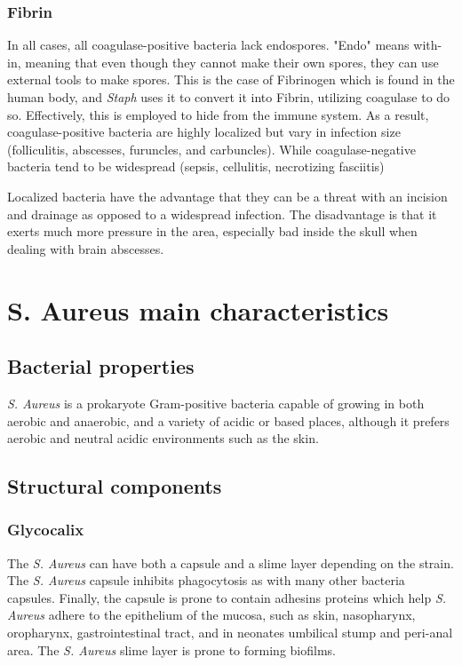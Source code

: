 \subsubsection{Fibrin}
\label{staph:Fibrin}

In all cases, all coagulase-positive bacteria lack endospores. "Endo" means with-in, meaning that even though they cannot make their own spores, they can use external tools to make spores. This is the case of Fibrinogen which is found in the human body, and \textit{Staph} uses it to convert it into Fibrin, utilizing coagulase to do so. Effectively, this is employed to hide from the immune system. As a result, coagulase-positive bacteria are highly localized but vary in infection size (folliculitis, abscesses, furuncles, and carbuncles). While coagulase-negative bacteria tend to be widespread (sepsis, cellulitis, necrotizing fasciitis)

Localized bacteria have the advantage that they can be a threat with an incision and drainage as opposed to a widespread infection. The disadvantage is that it exerts much more pressure in the area, especially bad inside the skull when dealing with brain abscesses.

\section{S. Aureus main characteristics}

\subsection{Bacterial properties}

\textit{S. Aureus} is a prokaryote Gram-positive bacteria capable of growing in both aerobic and anaerobic, and a variety of acidic or based places, although it prefers aerobic and neutral acidic environments such as the skin.

\subsection{Structural components}

\subsubsection{Glycocalix}

The \textit{S. Aureus} can have both a capsule and a slime layer depending on the strain. The \textit{S. Aureus} capsule inhibits phagocytosis as with many other bacteria capsules. Finally, the capsule is prone to contain adhesins proteins which help \textit{S. Aureus} adhere to the epithelium of the mucosa, such as skin, nasopharynx, oropharynx, gastrointestinal tract, and in neonates umbilical stump and peri-anal area. The \textit{S. Aureus} slime layer is prone to forming biofilms. \cite{Parastan2020}

